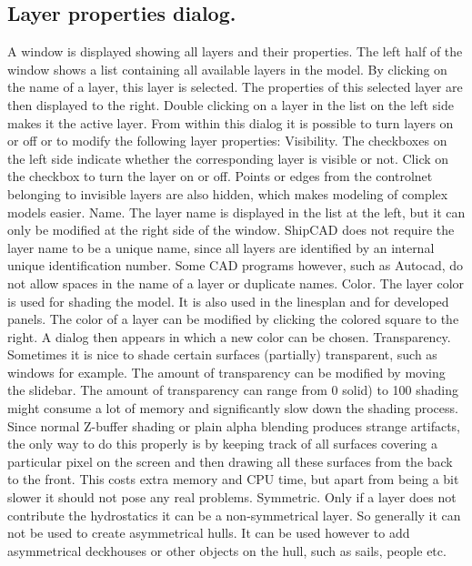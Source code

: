 \documentclass[12pt]{article}
\begin{document}
\subsection{Layer properties dialog.} \label{layer-properties}
A window is displayed showing all layers and
their properties. The left half of the window shows
a list containing all available layers in the model.
By clicking on the name of a layer, this layer is
selected. The properties of this selected layer are
then displayed to the right. Double clicking on a
layer in the list on the left side makes it the active
layer. From within this dialog it is possible to turn
layers on or off or to modify the following layer
properties:
Visibility.
The checkboxes on the left side indicate
whether the corresponding layer is visible
or not. Click on the checkbox to turn the layer on or off. Points or edges from the controlnet
belonging to invisible layers are also hidden, which makes modeling of complex models
easier.
Name.
The layer name is displayed in the list at the left, but it can only be modified at the right side
of the window. ShipCAD does not require the layer name to be a unique name, since all
layers are identified by an internal unique identification number. Some CAD programs
however, such as Autocad, do not allow spaces in the name of a layer or duplicate names.
Color.
The layer color is used for shading the model. It is also used in the linesplan and for
developed panels. The color of a layer can be modified by clicking the colored square to the
right. A dialog then appears in which a new color can be chosen.
Transparency.
Sometimes it is nice to shade certain surfaces (partially)
transparent, such as windows for example. The amount
of transparency can be modified by moving the slidebar.
The amount of transparency can range from 0%
solid) to 100%
shading might consume a lot of memory and
significantly slow down the shading process. Since
normal Z-buffer shading or plain alpha blending
produces strange artifacts, the only way to do this
properly is by keeping track of all surfaces covering a particular pixel on the screen and then
drawing all these surfaces from the back to the front. This costs extra memory and CPU
time, but apart from being a bit slower it should not pose any real problems.
Symmetric.
Only if a layer does not contribute the hydrostatics it can be a non-symmetrical layer. So
generally it can not be used to create asymmetrical hulls. It can be used however to add
asymmetrical deckhouses or other objects on the hull, such as sails, people etc.
\end{document}
